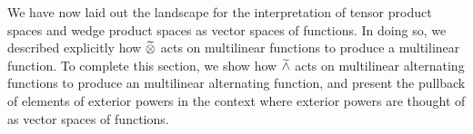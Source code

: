 
We have now laid out the landscape for the interpretation of tensor product spaces and wedge product spaces as vector spaces of functions. In doing so, we described explicitly how $\widetilde{\otimes}$ acts on multilinear functions to produce a multilinear function. To complete this section, we show how $\widetilde{\wedge}$ acts on multilinear alternating functions to produce an multilinear alternating function, and present the pullback of elements of exterior powers in the context where exterior powers are thought of as vector spaces of functions.

